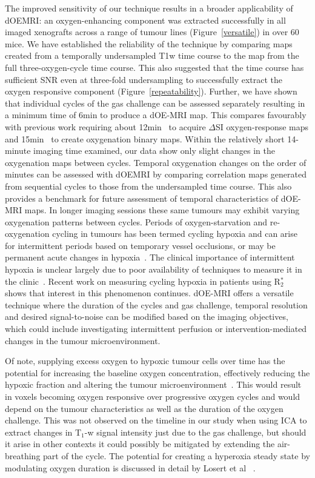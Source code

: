 The improved sensitivity of our technique results in a broader applicability of dOEMRI: an oxygen-enhancing component was extracted successfully in all imaged xenografts across a range of tumour lines (Figure~\ref{versatile}) in over 60 mice.
We have established the reliability of the technique by comparing maps created from a temporally undersampled T1w time course to the map from the full three-oxygen-cycle time course.
This also suggested that the time course has sufficient SNR even at three-fold undersampling to successfully extract the oxygen responsive component (Figure~\ref{repeatability}).
Further, we have shown that individual cycles of the gas challenge can be assessed separately resulting in a minimum time of 6min to produce a dOE-MRI map.
This compares favourably with previous work requiring about 12min~\cite{Zhao:2015ez} to acquire $\Delta$SI oxygen-response maps and 15min~\cite{OConnor:2016ee} to create oxygenation binary maps.
Within the relatively short 14-minute imaging time examined, our data show only slight changes in the oxygenation maps between cycles.
Temporal oxygenation changes on the order of minutes can be assessed with dOEMRI by comparing correlation maps generated from sequential cycles to those from the undersampled time course.
This also provides a benchmark for future assessment of temporal characteristics of dOE-MRI maps.
In longer imaging sessions these same tumours may exhibit varying oxygenation patterns between cycles.
Periods of oxygen-starvation and re-oxygenation cycling in tumours has been termed cycling hypoxia and can arise for intermittent periods based on temporary vessel occlusions, or may be permanent acute changes in hypoxia~\cite{Dewhirst:2009de,Bayer:2011js}.
The clinical importance of intermittent hypoxia is unclear largely due to poor availability of techniques to measure it in the clinic~\cite{Michiels:2016hv}.
Recent work on measuring cycling hypoxia in patients using R$_2^*$~\cite{Panek:2017ge} shows that interest in this phenomenon continues.
dOE-MRI offers a versatile technique where the duration of the cycles and gas challenge, temporal resolution and desired signal-to-noise can be modified based on the imaging objectives, which could include investigating intermittent perfusion or intervention-mediated changes in the tumour microenvironment.

Of note, supplying excess oxygen to hypoxic tumour cells over time has the potential for increasing the baseline oxygen concentration, effectively reducing the hypoxic fraction and altering the tumour microenvironment~\cite{Linnik:2013hf}.
This would result in voxels becoming oxygen responsive over progressive oxygen cycles and would depend on the tumour characteristics as well as the duration of the oxygen challenge.
This was not observed on the timeline in our study when using ICA to extract changes in T$_1$-w signal intensity just due to the gas challenge, but should it arise in other contexts it could possibly be mitigated by extending the air-breathing part of the cycle.
The potential for creating a hyperoxia steady state by modulating oxygen duration is discussed in detail by Losert et al ~\cite{Losert:2002gt}.

